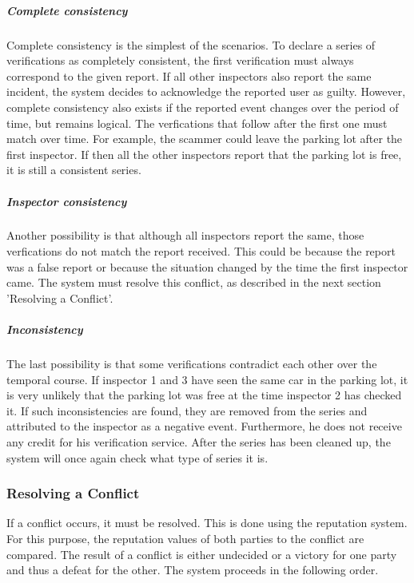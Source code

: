 \documentclass[
a4paper,     %
titlepage,   %
14pt         %
]{scrartcl}  %
\theoremstyle{mystyle}
\begin{document}
\subparagraph{Complete consistency} Complete consistency is the simplest of the scenarios. To declare a series of verifications as completely consistent, the first verification must always correspond to the given report. If all other inspectors also report the same incident, the system decides to acknowledge the reported user as guilty. However, complete consistency also exists if the reported event changes over the period of time, but remains logical. The verfications that follow after the first one must match over time. For example, the scammer could leave the parking lot after the first inspector. If then all the other inspectors report that the parking lot is free, it is still a consistent series.

\subparagraph{Inspector consistency} Another possibility is that although all inspectors report the same, those verfications do not match the report received. This could be because the report was a false report or because the situation changed by the time the first inspector came. The system must resolve this conflict, as described in the next section 'Resolving a Conflict'.

\subparagraph{Inconsistency} The last possibility is that some verifications contradict each other over the temporal course. If inspector 1 and 3 have seen the same car in the parking lot, it is very unlikely that the parking lot was free at the time inspector 2 has checked it. If such inconsistencies are found, they are removed from the series and attributed to the inspector as a negative event. Furthermore, he does not receive any credit for his verification service. After the series has been cleaned up, the system will once again check what type of series it is.

\subsubsection{Resolving a Conflict} If a conflict occurs, it must be resolved. This is done using the reputation system. For this purpose, the reputation values of both parties to the conflict are compared. The result of a conflict is either undecided or a victory for one party and thus a defeat for the other. The system proceeds in the following order.
\end{document}
